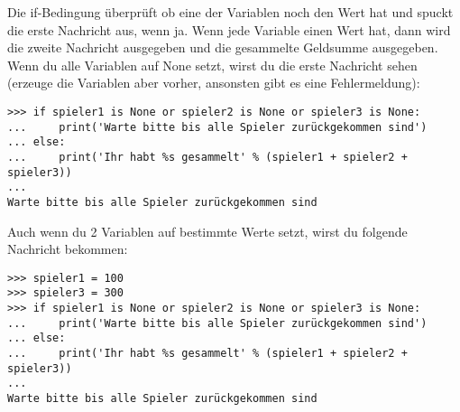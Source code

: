 Die if-Bedingung überprüft ob eine der Variablen noch den Wert  hat und spuckt die erste Nachricht aus, wenn ja. Wenn jede Variable einen Wert hat, dann wird die zweite Nachricht ausgegeben und die gesammelte Geldsumme ausgegeben. Wenn du alle Variablen auf None setzt, wirst du die erste Nachricht sehen (erzeuge die Variablen aber vorher, ansonsten gibt es eine Fehlermeldung):

\begin{Verbatim}[frame=single]
>>> if spieler1 is None or spieler2 is None or spieler3 is None:
...     print('Warte bitte bis alle Spieler zurückgekommen sind')
... else:
...     print('Ihr habt %s gesammelt' % (spieler1 + spieler2 + spieler3))
...
Warte bitte bis alle Spieler zurückgekommen sind
\end{Verbatim}

Auch wenn du 2 Variablen auf bestimmte Werte setzt, wirst du folgende Nachricht bekommen:

\begin{Verbatim}[frame=single]
>>> spieler1 = 100
>>> spieler3 = 300
>>> if spieler1 is None or spieler2 is None or spieler3 is None:
...     print('Warte bitte bis alle Spieler zurückgekommen sind')
... else:
...     print('Ihr habt %s gesammelt' % (spieler1 + spieler2 + spieler3))
...
Warte bitte bis alle Spieler zurückgekommen sind
\end{Verbatim}

